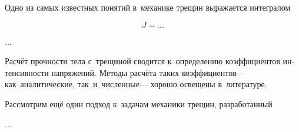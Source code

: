 






\begin{otherlanguage}{russian}

Одно из самых известных понятий в~механике трещин выражается интегралом

\nopagebreak\vspace{-0.2em}\begin{equation}
J = \ldots
\end{equation}

...



\end{otherlanguage}



\begin{otherlanguage}{russian}

Расчёт прочности тела с~трещиной сводится к~определению коэффициентов интенсивности напряжений.
Методы расчёта таких коэффициентов\:--- как~аналитические, так~и~численные\:--- хорошо освещены в~литературе.

Рассмотрим ещё один подход к~задачам механики трещин, разработанный

...



\end{otherlanguage}

